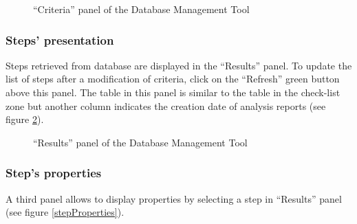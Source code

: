 {\begin{figure}[ht]
	\begin{center}
	\end{center}
	\caption{``Criteria'' panel of the Database Management Tool}
	\label{criteriaPanel}
\end{figure}

\subsubsection{Steps' presentation}

Steps retrieved from database are displayed in the ``Results'' panel. To update
the list of steps after a modification of criteria, click on the ``Refresh''
green button above this panel. The table in this panel is similar to the table
in the check-list zone but another column indicates the creation date of
analysis reports (see figure \ref{resultsPanel}).

\begin{figure}[ht]
	\begin{center}
	\end{center}
	\caption{``Results'' panel of the Database Management Tool}
	\label{resultsPanel}
\end{figure}

\subsubsection{Step's properties}

A third panel allows to display properties by selecting a step in ``Results''
panel (see figure \ref{stepProperties}).

}

